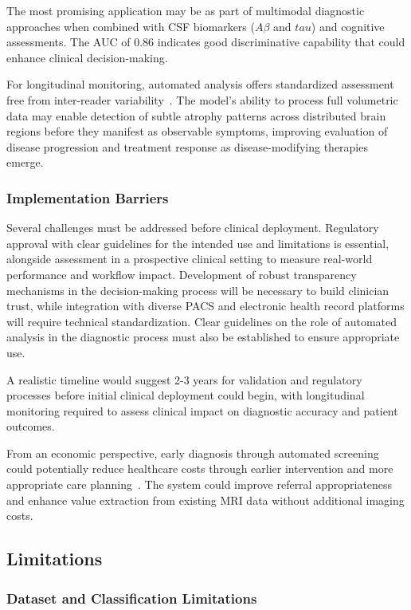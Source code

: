 \documentclass[11pt, a4paper]{article}
\begin{document}
The most promising application may be as part of multimodal diagnostic approaches when combined with CSF biomarkers ($A\beta$ and $tau$) and cognitive assessments. The AUC of 0.86 indicates good discriminative capability that could enhance clinical decision-making.

For longitudinal monitoring, automated analysis offers standardized assessment free from inter-reader variability~\cite{kloppel2008accuracy}. The model's ability to process full volumetric data may enable detection of subtle atrophy patterns across distributed brain regions before they manifest as observable symptoms, improving evaluation of disease progression and treatment response as disease-modifying therapies emerge.

\subsubsection{Implementation Barriers}

Several challenges must be addressed before clinical deployment. Regulatory approval with clear guidelines for the intended use and limitations is essential, alongside assessment in a prospective clinical setting to measure real-world performance and workflow impact. Development of robust transparency mechanisms in the decision-making process will be necessary to build clinician trust, while integration with diverse PACS and electronic health record platforms will require technical standardization. Clear guidelines on the role of automated analysis in the diagnostic process must also be established to ensure appropriate use.

A realistic timeline would suggest 2-3 years for validation and regulatory processes before initial clinical deployment could begin, with longitudinal monitoring required to assess clinical impact on diagnostic accuracy and patient outcomes.

From an economic perspective, early diagnosis through automated screening could potentially reduce healthcare costs through earlier intervention and more appropriate care planning~\cite{jack2018nia}. The system could improve referral appropriateness and enhance value extraction from existing MRI data without additional imaging costs.

\subsection{Limitations}

\subsubsection{Dataset and Classification Limitations}
\end{document}

